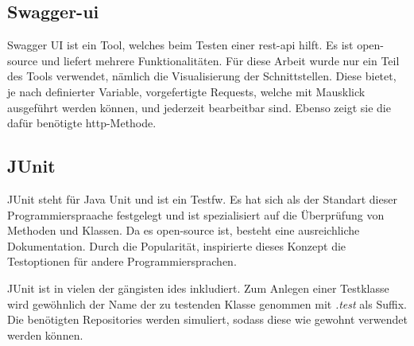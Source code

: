 \subsection{Swagger-ui}
Swagger UI ist ein Tool, welches beim Testen einer \gls{rest}-\gls{api} hilft. 
Es ist open-source und liefert mehrere Funktionalitäten.
Für diese Arbeit wurde nur ein Teil des Tools verwendet, nämlich die Visualisierung der Schnittstellen. 
Diese bietet, je nach definierter Variable, vorgefertigte Requests, welche mit Mausklick ausgeführt werden können, und jederzeit bearbeitbar sind.
Ebenso zeigt sie die dafür benötigte \gls{http}-Methode. 
\cite{SwaggeruiAbout}

\subsection{JUnit}
JUnit steht für Java Unit und ist ein Test\gls{fw}. 
Es hat sich als der Standart dieser Programmierspraache festgelegt und ist spezialisiert auf die Überprüfung von Methoden und Klassen.
Da es open-source ist, besteht eine ausreichliche Dokumentation.
Durch die Popularität, inspirierte dieses Konzept die Testoptionen für andere Programmiersprachen.

JUnit ist in vielen der gängisten \gls{ide}s inkludiert. 
Zum Anlegen einer Testklasse wird gewöhnlich der Name der zu testenden Klasse genommen mit \emph{.test} als Suffix. 
Die benötigten Repositories werden simuliert, sodass diese wie gewohnt verwendet werden können.
\cite{JUnitAbout}
